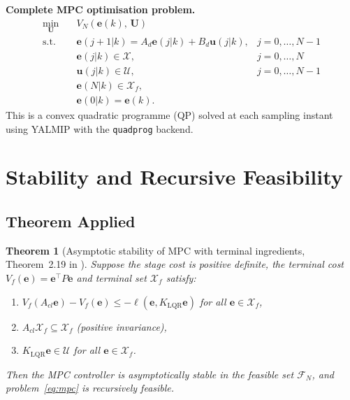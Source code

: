 \documentclass[11pt,a4paper]{article}
\newtheorem{theorem}{Theorem}
\newcommand{\vect}[1]{\bm{#1}}
\newcommand{\eset}{\mathcal{X}}
\newcommand{\uset}{\mathcal{U}}
\newcommand{\xf}{\mathcal{X}_f}
\begin{document}
\textbf{Complete MPC optimisation problem.}
\begin{equation}
\begin{aligned}
  \min_{\vect{U}}\quad & V_N(\vect{e}(k),\,\vect{U}) \\
  \mathrm{s.t.}\quad   & \vect{e}(j+1|k) = A_d\vect{e}(j|k) + B_d\vect{u}(j|k),
                           & j=0,\ldots,N-1 \\
                        & \vect{e}(j|k) \in \eset,
                           & j=0,\ldots,N   \\
                        & \vect{u}(j|k) \in \uset,
                           & j=0,\ldots,N-1 \\
                        & \vect{e}(N|k) \in \xf,                               \\
                        & \vect{e}(0|k) = \vect{e}(k).
\end{aligned}
\label{eq:mpc}
\end{equation}
This is a convex quadratic programme (QP) solved at each sampling instant using
YALMIP \cite{Lofberg2004} with the \texttt{quadprog} backend.

\section{Stability and Recursive Feasibility}
\label{sec:stability}

\subsection{Theorem Applied}

\begin{theorem}[Asymptotic stability of MPC with terminal ingredients,
  Theorem~2.19 in \cite{RawlingsMayne2017}]\label{thm:stability}
  Suppose the stage cost is positive definite, the terminal cost $V_f(\vect{e}) =
  \vect{e}^\top P\vect{e}$ and terminal set $\xf$ satisfy:
  \begin{enumerate}[label=\rm(A\arabic*), noitemsep]
    \item $V_f(A_{cl}\vect{e}) - V_f(\vect{e}) \leq -\ell(\vect{e},K_{\mathrm{LQR}}\vect{e})$
          for all $\vect{e}\in\xf$,
    \item $A_{cl}\xf \subseteq \xf$ (positive invariance),
    \item $K_{\mathrm{LQR}}\vect{e} \in \uset$ for all $\vect{e} \in \xf$.
  \end{enumerate}
  Then the MPC controller is asymptotically stable in the feasible set
  $\mathcal{F}_N$, and problem~\eqref{eq:mpc} is recursively feasible.
\end{theorem}
\end{document}
